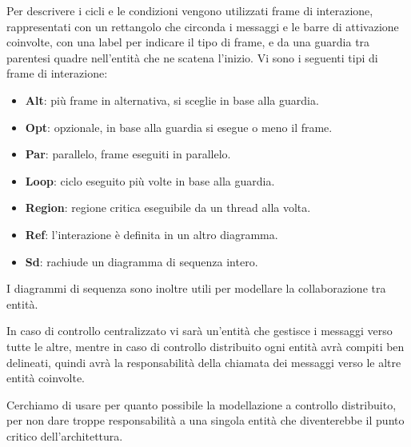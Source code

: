         Per descrivere i cicli e le condizioni vengono utilizzati frame di interazione, rappresentati con un rettangolo che circonda i messaggi e le barre di attivazione coinvolte, con una label per indicare il tipo di frame, e da una guardia tra parentesi quadre nell'entità che ne scatena l'inizio.
        Vi sono i seguenti tipi di frame di interazione:
        \begin{itemize}
            \item \textbf{Alt}: più frame in alternativa, si sceglie in base alla guardia.
            \item \textbf{Opt}: opzionale, in base alla guardia si esegue o meno il frame.
            \item \textbf{Par}: parallelo, frame eseguiti in parallelo.
            \item \textbf{Loop}: ciclo eseguito più volte in base alla guardia.
            \item \textbf{Region}: regione critica eseguibile da un thread alla volta.
            \item \textbf{Ref}: l'interazione è definita in un altro diagramma.
            \item \textbf{Sd}: rachiude un diagramma di sequenza intero.
        \end{itemize}
        I diagrammi di sequenza sono inoltre utili per modellare la collaborazione tra entità.\par
        In caso di controllo centralizzato vi sarà un'entità che gestisce i messaggi verso tutte le altre, mentre in caso di controllo distribuito ogni entità avrà compiti ben delineati, quindi avrà la responsabilità della chiamata dei messaggi verso le altre entità coinvolte.\par
        Cerchiamo di usare per quanto possibile la modellazione a controllo distribuito, per non dare troppe responsabilità a una singola entità che diventerebbe il punto critico dell'architettura.

